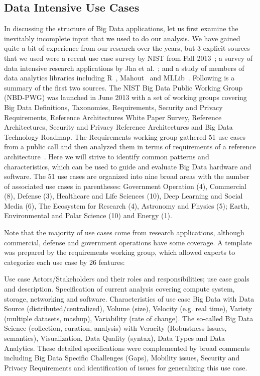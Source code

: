 \documentclass{acm_proc_article-sp}
\begin{document}
\subsection{Data Intensive Use Cases}
In discussing the structure of Big Data applications, let us first examine the inevitably incomplete input that we used to do our analysis. We have gained quite a bit of experience from our research over the years, but 3 explicit sources that we used were a recent use case survey by NIST from Fall 2013~\cite{bb}; a survey of data intensive research applications by Jha et al.~\cite{b28,b26}; and a study of members of data analytics libraries including R~\cite{b4}, Mahout~\cite{b1} and MLLib~\cite{b3}. Following is a summary of the first two sources.
The NIST Big Data Public Working Group (NBD-PWG) was launched in June 2013 with a set of working groups covering Big Data Definitions, Taxonomies, Requirements, Security and Privacy Requirements, Reference Architectures White Paper Survey, Reference Architectures, Security and Privacy Reference Architectures and Big Data Technology Roadmap. The Requirements working group gathered 51 use cases from a public call and then analyzed them in terms of requirements of a reference architecture~\cite{b21}. Here we will strive to identify common patterns and characteristics, which can be used to guide and evaluate Big Data hardware and software. The 51 use cases are organized into nine broad areas with the number of associated use cases in parentheses: Government Operation (4), Commercial (8), Defense (3), Healthcare and Life Sciences (10), Deep Learning and Social Media (6), The Ecosystem for Research (4), Astronomy and Physics (5); Earth, Environmental and Polar Science (10) and Energy (1).

Note that the majority of use cases come from research applications, although commercial, defense and government operations have some coverage. A template was prepared by the requirements working group, which allowed experts to categorize each use case by 26 features:

Use case Actors/Stakeholders and their roles and responsibilities; use case goals and description. Specification of current analysis covering compute system, storage, networking and software.  Characteristics of use case Big Data with Data Source (distributed/centralized), Volume (size), Velocity (e.g. real time), Variety (multiple datasets, mashup), Variability (rate of change). The so-called Big Data Science (collection, curation, analysis) with Veracity (Robustness Issues, semantics), Visualization, Data Quality (syntax), Data Types and Data Analytics. These detailed specifications were complemented by broad comments including Big Data Specific Challenges (Gaps), Mobility issues, Security and Privacy Requirements and identification of issues for generalizing this use case.
\end{document}
